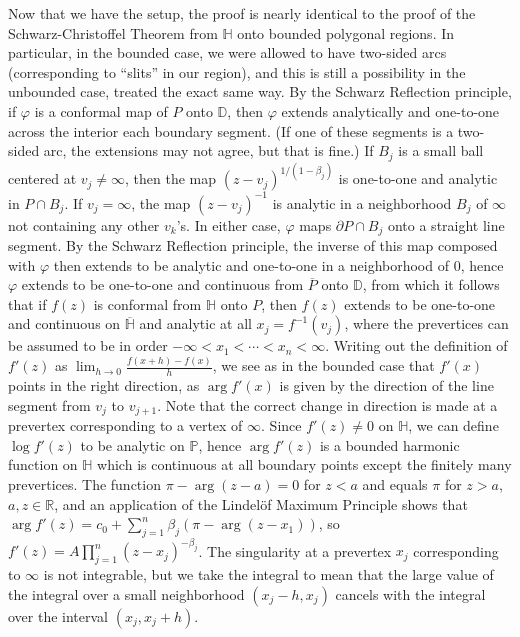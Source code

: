 \documentclass[11pt]{book}
\theoremstyle{definition}
\begin{document}
\begin{enumerate}
	Now that we have the setup, the proof is nearly identical to the proof of the Schwarz-Christoffel Theorem from $\mathbb H$ onto bounded polygonal regions.  In particular, in the bounded case, we were allowed to have two-sided arcs (corresponding to ``slits'' in our region), and this is still a possibility in the unbounded case, treated the exact same way.   By the Schwarz Reflection principle, if $\varphi$ is a conformal map of $P$ onto $\mathbb D$, then $\varphi$ extends analytically and one-to-one across the interior each boundary segment.  (If one of these segments is a two-sided arc, the extensions may not agree, but that is fine.)  If $B_j$ is a small ball centered at $v_j\neq \infty$, then the map $(z-v_j)^{1/(1-\beta_j)}$ is one-to-one and analytic in $P \cap B_j$.  If $v_j = \infty$, the map $(z-v_j)^{-1}$ is analytic in a neighborhood $B_j$ of $\infty$ not containing any other $v_k$'s.  In either case, $\varphi$ maps $\partial P \cap B_j$ onto a straight line segment.  By the Schwarz Reflection principle, the inverse of this map composed with $\varphi$ then extends to be analytic and one-to-one in a neighborhood of $0$, hence $\varphi$ extends to be one-to-one and continuous from $\overline P$ onto $\mathbb D$, from which it follows that if $f(z)$ is conformal from $\mathbb H$ onto $P$, then $f(z)$ extends to be one-to-one and continuous on $\overline{\mathbb H}$ and analytic at all $x_j = f^{-1} (v_j)$, where the prevertices can be assumed to be in order $-\infty < x_1 < \cdots < x_n < \infty$.  Writing out the definition of $f'(z)$ as $\lim_{h\to 0} \frac{f(x+h) - f(x)}{h}$, we see as in the bounded case that $f'(x)$ points in the right direction, as $\arg f'(x)$ is given by the direction of the line segment from $v_j$ to $v_{j+1}$.  Note that the correct change in direction is made at a prevertex corresponding to a vertex of $\infty$.  Since $f'(z) \neq 0$ on $\mathbb H$, we can define $\log f'(z)$ to be analytic on $\mathbb P$, hence $\arg f'(z)$ is a bounded harmonic function on $\mathbb H$ which is continuous at all boundary points except the finitely many prevertices.  The function $\pi - \arg (z-a) = 0$ for $z<a$ and equals $\pi$ for $z>a$, $a,z\in \mathbb R$, and an application of the Lindel\"{o}f Maximum Principle shows that $\arg f'(z) = c_0 + \sum_{j=1}^n \beta_j (\pi - \arg(z-x_1))$, so $f'(z) = A \prod_{j=1}^n (z-x_j)^{-\beta_j}$.  The singularity at a prevertex $x_j$ corresponding to $\infty$ is not integrable, but we take the integral to mean that the large value of the integral over a small neighborhood $(x_j - h, x_j)$ cancels with the integral over the interval $(x_j, x_j+h)$.  


\end{enumerate}
\end{document}
